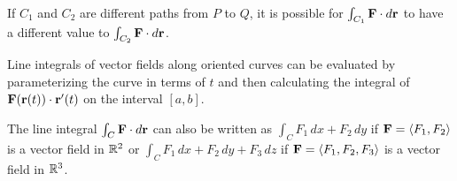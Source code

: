 

\begin{summary}
\item If $C_1$ and $C_2$ are different paths from $P$ to $Q$, it is
  possible for $\int_{C_1}\mathbf{F}\cdot d\mathbf{r}$ to have a different value to
  $\int_{C_2}\mathbf{F}\cdot d\mathbf{r}$.
\item Line integrals of vector fields along oriented curves can be
  evaluated by parameterizing the curve in terms of $t$ and then
  calculating the integral of $\mathbf{F}(\mathbf{r}(t))\cdot \mathbf{r}'(t)$ on the
  interval $[a,b]$.
\item The line integral $\int_C\mathbf{F}\cdot d\mathbf{r}$ can also be written as
  $\int_C F_1\, dx + F_2\, dy$ if $\mathbf{F} = \langle F_1,F_2\rangle$ is a
  vector field in $\mathbb{R}^2$ or $\int_C F_1\, dx + F_2\, dy + F_3\, dz$ if
  $\mathbf{F} = \langle F_1,F_2,F_3\rangle$ is a vector field in $\mathbb{R}^3$.
\end{summary}

\nin \hrulefill

%

\clearpage

